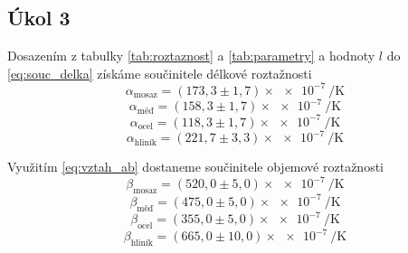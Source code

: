 \documentclass[protokol.tex]{subfiles}
\begin{document}
\subsection*{Úkol 3}
Dosazením z tabulky \ref{tab:roztaznost} a \ref{tab:parametry} a hodnoty $l$ do \eqref{eq:souc_delka} získáme součinitele délkové roztažnosti
$$ \alpha_{\text{mosaz}}  = (173,3 \pm 1,7) \times \num{e-7} \ \si{\per\kelvin} $$ 	
$$ \alpha_{\text{měď}}    = (158,3 \pm 1,7) \times \num{e-7} \ \si{\per\kelvin} $$
$$ \alpha_{\text{ocel}}   = (118,3 \pm 1,7) \times \num{e-7} \ \si{\per\kelvin} $$
$$ \alpha_{\text{hliník}} = (221,7 \pm 3,3) \times \num{e-7} \ \si{\per\kelvin} $$

Využitím \eqref{eq:vztah_ab} dostaneme součinitele objemové roztažnosti
$$ \beta_{\text{mosaz}}  = (520,0 \pm 5,0)  \times \num{e-7} \ \si{\per\kelvin} $$
$$ \beta_{\text{měď}}    = (475,0 \pm 5,0)  \times \num{e-7} \ \si{\per\kelvin} $$
$$ \beta_{\text{ocel}}   = (355,0 \pm 5,0)  \times \num{e-7} \ \si{\per\kelvin} $$
$$ \beta_{\text{hliník}} = (665,0 \pm 10,0) \times \num{e-7} \ \si{\per\kelvin} $$
\end{document}
